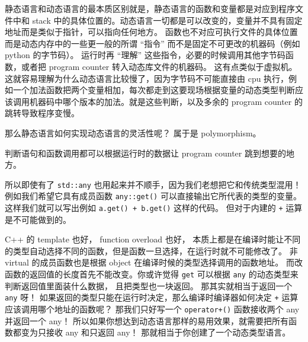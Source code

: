 静态语言和动态语言的最本质区别就是，静态语言的函数和变量都是对应到程序文件中和 stack 中的具体位置的。动态语言一切都是可以改变的，变量并不具有固定地址而是类似于指针，可以指向任何地方。 函数也不对应可执行文件的具体位置而是动态内存中的一些更一般的所谓 “指令” 而不是固定不可更改的机器码（例如 python 的字节码）。 运行时再 “理解” 这些指令，必要的时候调用其他字节码函数，或者把 program counter 转入动态库文件的机器码。 这有点类似于虚拟机。 这就容易理解为什么动态语言比较慢了，因为字节码不可能直接由 cpu 执行，例如一个加法函数把两个变量相加，每次都走到这要现场根据变量的动态类型判断应该调用机器码中哪个版本的加法。就是这些判断，以及多余的 program counter 的跳转导致程序变慢。

那么静态语言如何实现动态语言的灵活性呢？ 属于是 polymorphism。

判断语句和函数调用都可以根据运行时的数据让 program counter 跳到想要的地方。

所以即使有了 \verb`std::any` 也用起来并不顺手，因为我们老想把它和传统类型混用！例如我们希望它具有成员函数 \verb`any::get()` 可以直接输出它所代表的类型的变量。 这样我们就可以写出例如 \verb`a.get() + b.get()` 这样的代码。 但对于内建的 \verb`+` 运算是不可能做到的。

C++ 的 template 也好， function overload 也好， 本质上都是在编译时能让不同的类型自动选择不同的函数，但是函数一旦选择，在运行时就不可能修改了。 非 virtual 的成员函数也是根据 object 在编译时候的类型选择调用的函数地址。 而改函数的返回值的长度首先不能改变。你或许觉得 \verb`get` 可以根据 \verb`any` 的动态类型来判断返回值里面装什么数据， 且把类型也一块返回。 那其实就相当于返回一个 \verb`any` 呀！ 如果返回的类型只能在运行时决定，那么编译时编译器如何决定 \verb`+` 运算应该调用哪个地址的函数呢？ 那我们只好写一个 \verb`operator+()` 函数接收两个 any 并返回一个 any！ 所以如果你想达到动态语言那样的易用效果，就需要把所有函数都变为只接收 any 和只返回 any！ 那就相当于你创建了一个动态类型语言。
